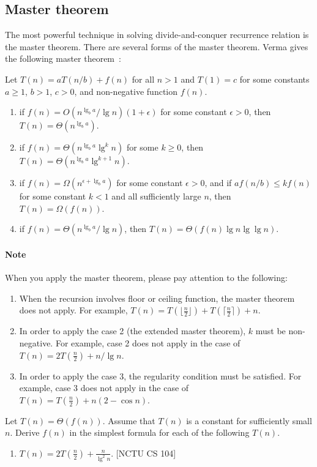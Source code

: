 \begin{refsection}
\subsection{Master theorem}
The most powerful technique in solving divide-and-conquer recurrence relation is the master theorem.
There are several forms of the master theorem. Verma gives the following master theorem~\cite{Verma1994}:
\begin{theorem}
Let $T(n) = aT(n / b) + f(n)$ for all $n > 1$ and $T(1) = c$ for some constants $a \geq 1$, $b > 1$, $c > 0$, and non-negative function $f(n)$.
\begin{enumerate}
\item if $f(n) = O(n^{\lg_b a} / \lg n)(1 + \epsilon)$ for some constant $\epsilon > 0$, then $T(n) = \Theta(n^{\lg_b a})$.
\item if $f(n) = \Theta(n^{\lg_b a} \lg^k n)$ for some $k \geq 0$, then $T(n) = \Theta(n^{\lg_b a} \lg^{k+1} n)$.
\item if $f(n) = \Omega(n^{\epsilon + \lg_b a})$ for some constant $\epsilon > 0$, and if $af(n/b) \leq kf(n)$ for some constant $k < 1$ and all sufficiently large $n$, then $T(n) = \Omega(f(n))$.
\item if $f(n) = \Theta(n^{\lg_b a} / \lg n)$, then $T(n) = \Theta(f(n) \lg n \lg \lg n)$.
\end{enumerate}
\end{theorem}

\paragraph{Note} When you apply the master theorem, please pay attention to the following:
\begin{enumerate}
\item When the recursion involves floor or ceiling function, the master theorem does not apply. For example, $T(n) = T(\lfloor \frac{n}{2} \rfloor) + T(\lceil \frac{n}{2} \rceil) + n$. 
\item In order to apply the case 2 (the extended master theorem), $k$ must be non-negative. For example, case 2 does not apply in the case of $T(n) = 2T(\frac{n}{2}) + n/ \lg n$.
\item In order to apply the case 3, the regularity condition must be satisfied. For example, case 3 does not apply in the case of $T(n) = T(\frac{n}{2}) + n(2 - \cos n)$.
\end{enumerate}

\begin{Exercise}
Let $T(n) = \Theta(f(n))$. Assume that $T(n)$ is a constant for sufficiently small $n$. Derive $f(n)$ in the simplest formula for each of the following $T(n)$.
\begin{enumerate}
\item $T(n) = 2T(\frac{n}{2}) + \frac{n}{\lg^2 n}$. \label{master:1} [NCTU CS 104]
\end{enumerate}
\end{Exercise}
\begin{Answer}


\end{Answer}
\end{refsection}

